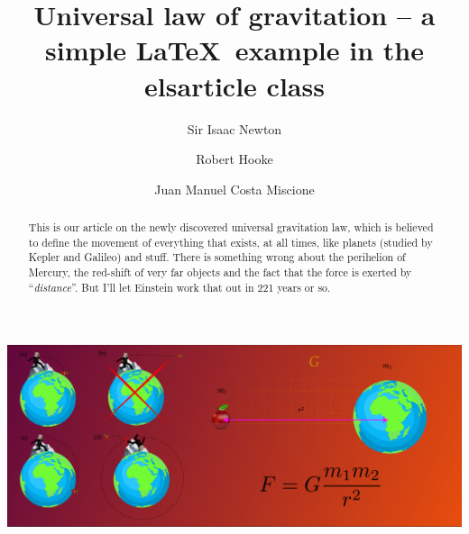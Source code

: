 \documentclass[preprint,12pt]{elsarticle}
\begin{document}
\begin{frontmatter}

\title{Universal law of gravitation -- a simple \LaTeX\ example in the elsarticle class}

\author[1]{Sir Isaac Newton}

\author[2]{Robert Hooke}

\author[3]{Juan Manuel Costa Miscione}


            


            
\begin{abstract}
This is our article on the newly discovered universal gravitation law, which is believed to define the movement of everything that exists, at all times, like planets (studied by Kepler and Galileo) and stuff. There is something wrong about the perihelion of Mercury, the red-shift of very far objects and the fact that the force is exerted by ``\emph{distance}''. But I'll let Einstein work that out in 221 years or so.
\end{abstract}

\begin{graphicalabstract}
\includegraphics[width=\textwidth]{GA.pdf} %
\end{graphicalabstract}


\end{frontmatter}
\end{document}
